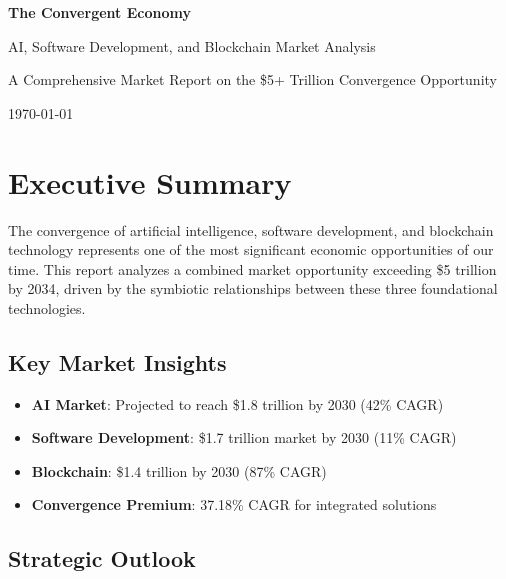 \documentclass[11pt,a4paper]{report}
\begin{document}
\begin{titlepage}
\centering
\vspace*{2cm}

{\Huge\bfseries\color{primaryblue} The Convergent Economy}

\vspace{1cm}

{\Large\color{accentgreen} AI, Software Development, and Blockchain Market Analysis}

\vspace{2cm}

{\large A Comprehensive Market Report on the \$5+ Trillion Convergence Opportunity}

\vspace{3cm}

{\large \today}

\vfill
\end{titlepage}

\tableofcontents
\newpage

\chapter*{Executive Summary}

The convergence of artificial intelligence, software development, and blockchain technology represents one of the most significant economic opportunities of our time. This report analyzes a combined market opportunity exceeding \$5 trillion by 2034, driven by the symbiotic relationships between these three foundational technologies.

\section*{Key Market Insights}

\begin{itemize}
\item \textbf{AI Market}: Projected to reach \$1.8 trillion by 2030 (42\% CAGR)
\item \textbf{Software Development}: \$1.7 trillion market by 2030 (11\% CAGR)  
\item \textbf{Blockchain}: \$1.4 trillion by 2030 (87\% CAGR)
\item \textbf{Convergence Premium}: 37.18\% CAGR for integrated solutions
\end{itemize}

\section*{Strategic Outlook}
\end{document}
